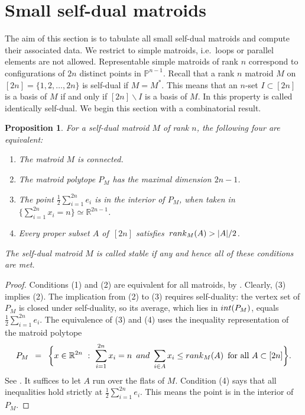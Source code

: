 \documentclass[12pt]{extarticle}
\newtheorem{proposition}[theorem]{Proposition}
\theoremstyle{definition}
\numberwithin{theorem}{section}
\theoremstyle{plain}\newtheorem{ithm}{Theorem}
\newcommand{\PP}{\mathbb{P}}
\newcommand{\RR}{\mathbb{R}}
\begin{document}
\section{Small self-dual matroids}
\label{sec3}

The aim of this section is to tabulate all small self-dual matroids and compute their associated data.
We restrict to simple matroids, i.e.~loops or parallel elements
are not allowed. Representable simple matroids of rank $n$ correspond to configurations of
$2n$ distinct points in $\PP^{n-1}$. Recall that a rank $n$ matroid $M$
on $[2n]= \{1,2,\ldots,2n\}$ is self-dual if $M = M^*$. This means that an $n$-set $I \subset [2n]$ is a basis of $M$ if and only if $[2n] \backslash I$ is a basis of $M$.  
In \cite{Lind, Ox, Per} this property is called identically self-dual.
  We begin this section with a combinatorial result.

\begin{proposition} \label{prop:stable}
  For a self-dual matroid $M$ of rank $n$, the following four are equivalent: \vspace{-0.1cm}
  \begin{enumerate} 
  \item[(1)] The matroid $M$ is connected. \vspace{-0.2cm}
\item[(2)]  The matroid polytope $P_M$ has the maximal dimension $2n-1$. \vspace{-0.2cm}
\item[(3)] The point $\frac{1}{2} \sum_{i=1}^{2n} e_i$ is in the interior
of $P_M$, when taken in $\bigl\{ \sum_{i=1}^{2n} x_i = n \bigr\} \simeq \RR^{2n-1}$. \vspace{-0.2cm}
\item[(4)] Every proper subset $A$ of $\,[2n]$ satisfies $\,{\rm rank}_M(A) > |A|/2$. \vspace{-0.1cm}
  \end{enumerate}
The self-dual matroid $M$ is called {\em stable} if any and hence all of these conditions are met.
\end{proposition}

\begin{proof}
Conditions (1) and (2) are equivalent for all matroids, by \cite[Proposition 2.4]{FS}.
Clearly, (3) implies (2). The implication from (2) to (3) requires self-duality:
the vertex set of $P_M$ is closed under self-duality, so its average,
which lies in ${\rm int}(P_M)$, equals
$\frac{1}{2} \sum_{i=1}^{2n} e_i$. 
The equivalence of (3) and (4) uses the inequality representation of the matroid polytope
$$ P_M \,\,\,= \,\,\, \biggl\{ x \in \RR^{2n} \,\,:\,\,
\sum_{i=1}^{2n} x_i = n \,\,\, {\rm and} \,\, \sum_{i \in A} x_i \leq {\rm rank}_M(A) \,\,\,
\hbox{for all $A \subset [2n]$} \biggr\}. $$
See \cite[Proposition 2.3]{FS}. It suffices to let $A$ run over the flats of $M$.
Condition (4) says that all inequalities hold strictly at
$\frac{1}{2} \sum_{i=1}^{2n} e_i$. This means the point is in the interior of $P_M$.
\end{proof}
\end{document}

